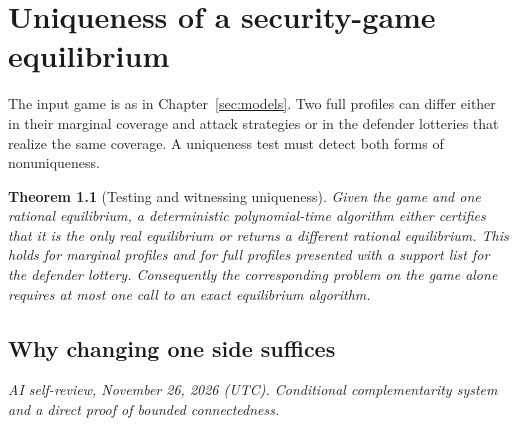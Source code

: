 \documentclass[11pt,oneside,openany,notitlepage]{report}
\newtheorem{theorem}{Theorem}[chapter]
\newcommand{\reviewdate}{November 26, 2026 (UTC)}
\newcommand{\reviewmark}[1]{\par\nopagebreak[4]\noindent
  {\footnotesize\itshape AI self-review, \reviewdate. #1\par}\nobreak\smallskip}
\begin{document}
\chapter{Uniqueness of a security-game equilibrium}\label{sec:unique}

The input game is as in Chapter~\ref{sec:models}. Two full profiles
can differ either in their marginal coverage and attack strategies or in
the defender lotteries that realize the same coverage. A uniqueness
test must detect both forms of nonuniqueness.

\begin{theorem}[Testing and witnessing uniqueness]\label{thm:unique}
Given the game and one rational equilibrium, a deterministic
polynomial-time algorithm either certifies that it is the only real
equilibrium or returns a different rational equilibrium. This holds for
marginal profiles and for full profiles presented with a support list for
the defender lottery. Consequently the corresponding problem on the game
alone requires at most one call to an exact equilibrium algorithm.
\end{theorem}

\section{Why changing one side suffices}
\reviewmark{Conditional complementarity system and a direct proof of bounded connectedness.}
\end{document}
